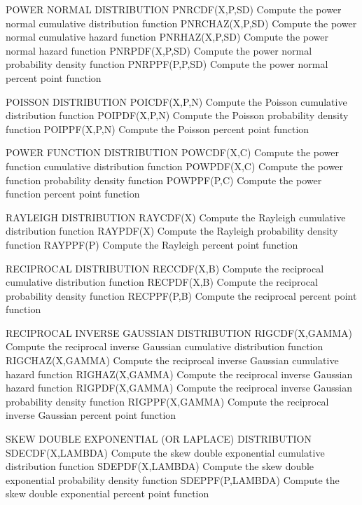 POWER NORMAL DISTRIBUTION
   PNRCDF(X,P,SD)     Compute the power normal cumulative distribution
                      function
   PNRCHAZ(X,P,SD)    Compute the power normal cumulative hazard
                      function
   PNRHAZ(X,P,SD)     Compute the power normal hazard function
   PNRPDF(X,P,SD)     Compute the power normal probability density
                      function
   PNRPPF(P,P,SD)     Compute the power normal percent point function
 
POISSON DISTRIBUTION
   POICDF(X,P,N)      Compute the Poisson cumulative distribution
                      function
   POIPDF(X,P,N)      Compute the Poisson probability density function
   POIPPF(X,P,N)      Compute the Poisson percent point function
 
POWER FUNCTION DISTRIBUTION
   POWCDF(X,C)        Compute the power function cumulative
                      distribution function
   POWPDF(X,C)        Compute the power function probability density
                      function
   POWPPF(P,C)        Compute the power function percent point function
 
RAYLEIGH DISTRIBUTION
   RAYCDF(X)          Compute the Rayleigh cumulative distribution
                      function
   RAYPDF(X)          Compute the Rayleigh probability density function
   RAYPPF(P)          Compute the Rayleigh percent point function

RECIPROCAL DISTRIBUTION
   RECCDF(X,B)        Compute the reciprocal cumulative distribution
                      function
   RECPDF(X,B)        Compute the reciprocal probability density
                      function
   RECPPF(P,B)        Compute the reciprocal percent point function

RECIPROCAL INVERSE GAUSSIAN DISTRIBUTION
   RIGCDF(X,GAMMA)    Compute the reciprocal inverse Gaussian
                      cumulative distribution function
   RIGCHAZ(X,GAMMA)   Compute the reciprocal inverse Gaussian
                      cumulative hazard function
   RIGHAZ(X,GAMMA)    Compute the reciprocal inverse Gaussian hazard
                      function
   RIGPDF(X,GAMMA)    Compute the reciprocal inverse Gaussian
                      probability density function
   RIGPPF(X,GAMMA)    Compute the reciprocal inverse Gaussian percent
                      point function
 
SKEW DOUBLE EXPONENTIAL (OR LAPLACE) DISTRIBUTION
   SDECDF(X,LAMBDA)   Compute the skew double exponential cumulative
                      distribution function
   SDEPDF(X,LAMBDA)   Compute the skew double exponential
                      probability density function
   SDEPPF(P,LAMBDA)   Compute the skew double exponential
                      percent point function

